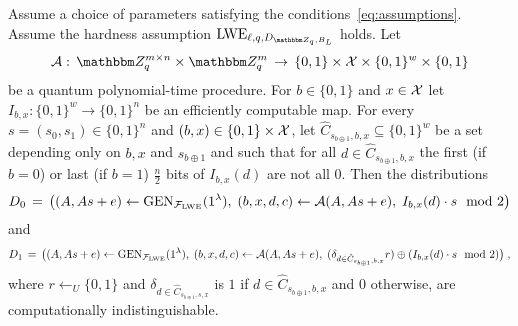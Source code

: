 \begin{lemma}\label{lem:lweadaptiveleakage}
Assume a choice of parameters satisfying the conditions~\eqref{eq:assumptions}. Assume the hardness assumption $\lwe_{\ell,q,D_{\mZ_q,B_L}}$ holds. Let
$$\mathcal{A}:\, \mZ_q^{m\times n} \times \mZ_q^m \,\to\,\{0,1\}\times \sX \times \{0,1\}^w \times\{0,1\}$$
be a quantum polynomial-time procedure. For $b\in\{0,1\}$ and $x\in\mathcal{X}$ let $I_{b,x}:\{0,1\}^w \to \{0,1\}^n$ be an efficiently computable map. For every $s = (s_0,s_1)\in\{0,1\}^n$ and $(b,x)\in\{0,1\}\times\mathcal{X}$, let $\hat{C}_{s_{b\oplus 1},b,x}\subseteq \{0,1\}^w$ be a set depending only on $b,x$ and $s_{b\oplus 1}$ and such that for all $d\in \hat{C}_{s_{b\oplus 1},b,x}$ the first (if $b=0$) or last (if $b=1$) $\frac{n}{2}$ bits of $I_{b,x}(d)$ are not all $0$.
 Then the distributions
\begin{eqnarray}\label{eq:l14-1}
{D}_0 \,=\, \big( (\*A,\*A\*s+\*e) \leftarrow \textrm{GEN}_{\mathcal{F}_{\lwe}}(1^{\lambda}) ,\; (b,x,d,c) \leftarrow \mathcal{A}(\*A,\*A\*s+\*e),\; I_{b,x}(d) \cdot s \mod 2\big) 
\end{eqnarray}
and
\begin{eqnarray}\label{eq:l14-2}
{D}_1 \,=\, \big( (\*A,\*A\*s+\*e) \leftarrow \textrm{GEN}_{\mathcal{F}_{\lwe}}(1^{\lambda}) ,\;(b,x,d,c) \leftarrow \mathcal{A}(\*A,\*A\*s+\*e), \; (\delta_{d\in \hat{C}_{s_{b\oplus 1},b,x}} r) \oplus (I_{b,x}(d) \cdot s\mod 2) \big)\;, 
\end{eqnarray}
where $r\leftarrow_U \{0,1\}$ and $\delta_{d\in \hat{C}_{s_{b\oplus 1},s,x}}$ is $1$ if $d\in \hat{C}_{s_{b\oplus 1},b,x}$ and $0$ otherwise, are computationally indistinguishable. 
\end{lemma}


